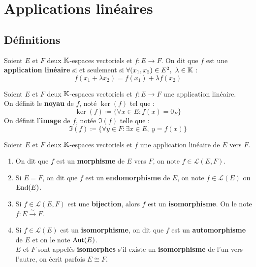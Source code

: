 \chapter{Applications linéaires}

\section{Définitions}
\begin{definition}
    Soient $E$ et $F$ deux $\mathbb{K}$-espaces vectoriels et $f : E \to F$.
    On dit que $f$ est une \textbf{application linéaire} si et seulement si $\forall (x_1, x_2) \in E^2,\ \lambda \in \mathbb{K}$ :
    \[ f(x_1 + \lambda x_2) = f(x_1) + \lambda f(x_2) \]
\end{definition}

\begin{definition}
    Soient $E$ et $F$ deux $\mathbb{K}$-espaces vectoriels et $f : E \to F$ une application linéaire.
    \\
    On définit le \textbf{noyau} de $f$, noté $\ker(f)$ tel que :
    \[ \ker(f) \coloneqq \{ \forall x \in E : f(x) = 0_E \} \] 
    On définit l'\textbf{image} de $f$, notée $\Im(f)$ telle que :
    \[ \Im(f) \coloneqq \{ \forall y \in F : \exists x \in E,\ y = f(x) \} \]
\end{definition}

\begin{definition}
    \par \noindent Soient $E$ et $F$ deux $\mathbb{K}$-espaces vectoriels et $f$ une application linéaire de $E$ vers $F$.
    \begin{enumerate}
        \item On dit que $f$ est un \textbf{morphisme} de $E$ vers $F$, on note $f \in \mathcal{L}(E, F)$.
        \item Si $E = F$, on dit que $f$ est un \textbf{endomorphisme} de $E$, on note $f \in \mathcal{L}(E)$ ou $\operatorname{End}(E)$.
        \item Si $f \in \mathcal{L}(E, F)$ est une \textbf{bijection}, alors $f$ est un \textbf{isomorphisme}. On le note $f : E \overset{\sim}{\to} F$.
        \item Si $f \in \mathcal{L}(E)$ est un \textbf{isomorphisme}, on dit que $f$ est un \textbf{automorphisme} de $E$ et on le note $\operatorname{Aut}(E)$.
        \\
        $E$ et $F$ sont appelés \textbf{isomorphes} s'il existe un \textbf{isomorphisme} de l'un vers l'autre, on écrit parfois $E \cong F$.
    \end{enumerate}
\end{definition}

